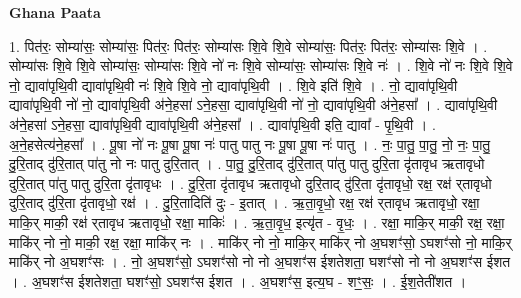 \documentclass[17pt]{extarticle}
\begin{document}
\textbf{Ghana Paata } \newline

1. पित॑रः॒ सोम्या॑सः॒ सोम्या॑सः॒ पित॑रः॒ पित॑रः॒ सोम्या॑सः शि॒वे शि॒वे सोम्या॑सः॒ पित॑रः॒ पित॑रः॒ सोम्या॑सः शि॒वे । . सोम्या॑सः शि॒वे शि॒वे सोम्या॑सः॒ सोम्या॑सः शि॒वे नो॑ नः शि॒वे सोम्या॑सः॒ सोम्या॑सः शि॒वे नः॑ । . शि॒वे नो॑ नः शि॒वे शि॒वे नो॒ द्यावा॑पृथि॒वी द्यावा॑पृथि॒वी नः॑ शि॒वे शि॒वे नो॒ द्यावा॑पृथि॒वी । . शि॒वे इति॑ शि॒वे । . नो॒ द्यावा॑पृथि॒वी द्यावा॑पृथि॒वी नो॑ नो॒ द्यावा॑पृथि॒वी अ॑ने॒हसा॑ ऽने॒हसा॒ द्यावा॑पृथि॒वी नो॑ नो॒ द्यावा॑पृथि॒वी अ॑ने॒हसा᳚ । . द्यावा॑पृथि॒वी अ॑ने॒हसा॑ ऽने॒हसा॒ द्यावा॑पृथि॒वी द्यावा॑पृथि॒वी अ॑ने॒हसा᳚ । . द्यावा॑पृथि॒वी इति॒ द्यावा᳚ - पृ॒थि॒वी । . अ॒ने॒हसेत्य॑ने॒हसा᳚ । . पू॒षा नो॑ नः पू॒षा पू॒षा नः॑ पातु पातु नः पू॒षा पू॒षा नः॑ पातु । . नः॒ पा॒तु॒ पा॒तु॒ नो॒ नः॒ पा॒तु॒ दु॒रि॒ताद् दु॑रि॒तात् पा॑तु नो नः पातु दुरि॒तात् । . पा॒तु॒ दु॒रि॒ताद् दु॑रि॒तात् पा॑तु पातु दुरि॒ता दृ॑तावृध ऋतावृधो दुरि॒तात् पा॑तु पातु दुरि॒ता दृ॑तावृधः । . दु॒रि॒ता दृ॑तावृध ऋतावृधो दुरि॒ताद् दु॑रि॒ता दृ॑तावृधो॒ रक्ष॒ रक्ष॑ र्‌तावृधो दुरि॒ताद् दु॑रि॒ता दृ॑तावृधो॒ रक्ष॑ । . दु॒रि॒तादिति॑ दुः - इ॒तात् । . ऋ॒ता॒वृ॒धो॒ रक्ष॒ रक्ष॑ र्‌तावृध ऋतावृधो॒ रक्षा॒ माकि॒र् माकी॒ रक्ष॑ र्‌तावृध ऋतावृधो॒ रक्षा॒ माकिः॑ । . ऋ॒ता॒वृ॒ध॒ इत्यृ॑त - वृ॒धः॒ । . रक्षा॒ माकि॒र् माकी॒ रक्ष॒ रक्षा॒ माकि॑र् नो नो॒ माकी॒ रक्ष॒ रक्षा॒ माकि॑र् नः । . माकि॑र् नो नो॒ माकि॒र् माकि॑र् नो अ॒घशꣳ॑सो॒ ऽघशꣳ॑सो नो॒ माकि॒र् माकि॑र् नो अ॒घशꣳ॑सः । . नो॒ अ॒घशꣳ॑सो॒ ऽघशꣳ॑सो नो नो अ॒घशꣳ॑स ईशतेशता॒ घशꣳ॑सो नो नो अ॒घशꣳ॑स ईशत । . अ॒घशꣳ॑स ईशतेशता॒ घशꣳ॑सो॒ ऽघशꣳ॑स ईशत । . अ॒घशꣳ॑स॒ इत्य॒घ - शꣳ॒॒सः॒ । . ई॒श॒तेती॑शत । \newline
\end{document}
